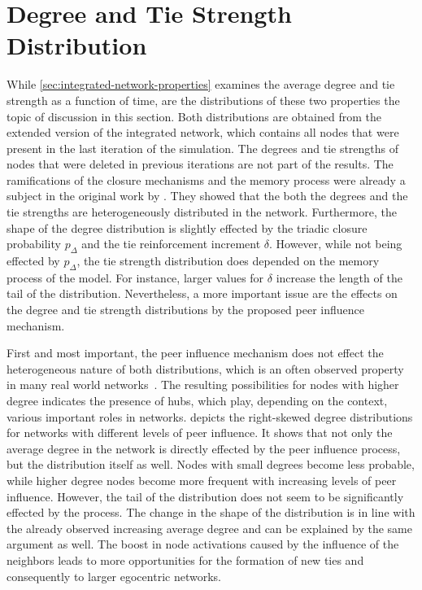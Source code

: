 \section{Degree and Tie Strength Distribution}
\label{sec:weight-and-degree-distribution}

While \cref{sec:integrated-network-properties} examines the average degree and tie strength as a function of time, are the distributions of these two properties the topic of discussion in this section.
Both distributions are obtained from the extended version of the integrated network, which contains all nodes that were present in the last iteration of the simulation.
The degrees and tie strengths of nodes that were deleted in previous iterations are not part of the results.
The ramifications of the closure mechanisms and the memory process were already a subject in the original work by \citet{Laurent2015}.
They showed that the both the degrees and the tie strengths are heterogeneously distributed in the network.
Furthermore, the shape of the degree distribution is slightly effected by the triadic closure probability \( p_{\Delta} \) and the tie reinforcement increment \( \delta \).
However, while not being effected by \( p_{\Delta} \), the tie strength distribution does depended on the memory process of the model.
For instance, larger values for \( \delta \) increase the length of the tail of the distribution.
Nevertheless, a more important issue are the effects on the degree and tie strength distributions by the proposed peer influence mechanism.

First and most important, the peer influence mechanism does not effect the heterogeneous nature of both distributions, which is an often observed property in many real world networks~\cite{Barabasi2002, Karsai2014}.
The resulting possibilities for nodes with higher degree indicates the presence of hubs, which play, depending on the context, various important roles in networks.
 depicts the right-skewed degree distributions for networks with different levels of peer influence.
It shows that not only the average degree in the network is directly effected by the peer influence process, but the distribution itself as well.
Nodes with small degrees become less probable, while higher degree nodes become more frequent with increasing levels of peer influence.
However, the tail of the distribution does not seem to be significantly effected by the process.
The change in the shape of the distribution is in line with the already observed increasing average degree and can be explained by the same argument as well.
The boost in node activations caused by the influence of the neighbors leads to more opportunities for the formation of new ties and consequently to larger egocentric networks.


